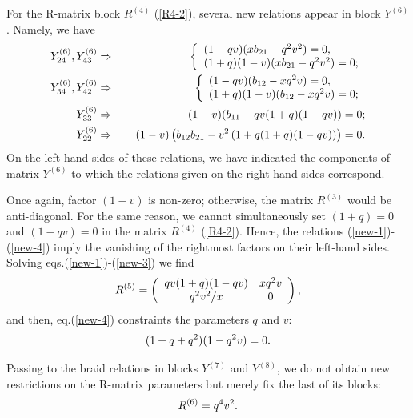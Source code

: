 \documentclass[11pt]{article}
\def\be{\begin{equation}}\def\ee{\end{equation}}
\def\ba{\begin{eqnarray}}\def\ea{\end{eqnarray}}
\begin{document}
For the R-matrix block $R^{(4)}$ (\ref{R4-2}), several new relations appear in block $Y^{(6)}$. Namely, we have
\ba
\lb{new-1}
Y^{(6)}_{24}, Y^{(6)}_{43} &\Rightarrow &
\left\{
\begin{array}{l}
 (1-q v) (x b_{21} - q^2 v^2 ) =0,
\\
(1+q)(1-v)(x b_{21} - q^2 v^2 ) =0;
\end{array}	
\right.
\\
\lb{new-2}
Y^{(6)}_{34}, Y^{(6)}_{42} &\Rightarrow &
	\left\{
	\begin{array}{l}
		(1-q v) ( b_{12} - x q^2 v ) =0,
		\\
		(1+q)(1-v)( b_{12} - x q^2 v ) =0;
	\end{array}	
	\right.
	\\
	\lb{new-3}
	Y^{(6)}_{33} &\Rightarrow & \quad\,(1-v)(b_{11}- q v (1+q)(1-q v)) =0;
	\\
	\lb{new-4}
	Y^{(6)}_{22} &\Rightarrow & \quad\,(1-v)\left(b_{12}b_{21}-  v^2 \left(1+q(1+q)(1-q v)\right)\right) =0.
\ea
On the left-hand sides of these relations, we have indicated the components of matrix $Y^{(6)}$ to which the relations given on the right-hand sides correspond.

Once again, factor $(1-v)$ is non-zero; otherwise, the matrix $R^{(3)}$ would be anti-diagonal. For the same reason, we cannot simultaneously set $(1+q)=0$ and $(1-q v)=0$ in the matrix $R^{(4)}$ (\ref{R4-2}). Hence,  the relations (\ref{new-1})-(\ref{new-4}) imply the vanishing of the rightmost factors on their left-hand sides. Solving eqs.(\ref{new-1})-(\ref{new-3}) we find
\be 
\lb{R5-b}
R^{(5)} =\left(
\begin{array}{cc}
	q v (1+q)(1-q v) &	x q^2 v
	\\
	q^2 v^2/x & 	 0
\end{array}\right),
\ee
and then, eq.(\ref{new-4}) constraints the parameters $q$ and $v$:
\be 
\lb{u-v}
(1+q+q^2)(1-q^2 v)=0.
\ee

Passing to the braid relations in blocks $Y^{(7)}$ and $Y^{(8)}$, we do not obtain new restrictions on the R-matrix parameters but merely fix the last of its blocks: 
\be 
\lb{R6-b}
R^{(6)}= q^4 v^2.
\ee
\end{document}
